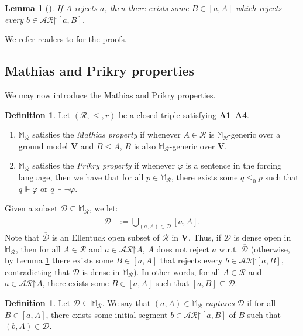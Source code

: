 \documentclass[10pt,a4paper]{amsart}
\theoremstyle{plain}
\numberwithin{equation}{section}
\newtheorem{lemma}[theorem]{Lemma}
\theoremstyle{definition}
\newtheorem{definition}[theorem]{Definition}
\renewcommand{\bar}[1]{\overline{#1}}
\newcommand{\cal}{\mathcal}
\renewcommand{\bf}{\mathbf}
\newcommand{\forces}{\Vdash}
\newcommand{\restrictedto}{\mathord{\upharpoonright}}
\newcommand{\V}{\bf{V}}
\newcommand{\D}{\cal{D}}
\DeclareRobustCommand{\S}{\ifmmode\mathcal{S}\else\Sec\fi}
\begin{document}
\begin{lemma}[{\cite[Lemma 4.35]{T10}}]
\label{lem:completely.reject.reduction}
    If $A$ rejects $a$, then there exists some $B \in [a,A]$ which rejects every $b \in \cal{AR}\restrictedto[a,B]$.
\end{lemma}

We refer readers to \cite[\S4]{T10} for the proofs.

\subsection{Mathias and Prikry properties}
We may now introduce the Mathias and Prikry properties.

\begin{definition}
    Let $(\cal{R},\leq,r)$ be a closed triple satisfying \textbf{A1}--\textbf{A4}.
    \begin{enumerate}
        \item $\mathbb{M}_\cal{R}$ satisfies the \emph{Mathias property} if whenever $A \in \cal{R}$ is $\mathbb{M}_\cal{R}$-generic over a ground model $\V$ and $B \leq A$, $B$ is also $\mathbb{M}_\cal{R}$-generic over $\V$.

        \item $\mathbb{M}_\cal{R}$ satisfies the \emph{Prikry property} if whenever $\varphi$ is a sentence in the forcing language, then we have that for all $p \in \mathbb{M}_\cal{R}$, there exists some $q \leq_0 p$ such that $q \forces \varphi$ or $q \forces \neg\varphi$.
    \end{enumerate}
\end{definition}

Given a subset $\D \subseteq \mathbb{M}_\cal{R}$, we let:
\begin{align*}
    \bar{\D} &:= \bigcup_{(a,A) \in \D} [a,A].
\end{align*}
Note that $\bar{\D}$ is an Ellentuck open subset of $\cal{R}$ in $\V$. Thus, if $\D$ is dense open in $\mathbb{M}_\cal{R}$, then for all $A \in \cal{R}$ and $a \in \cal{AR}\restrictedto A$, $A$ does not reject $a$ w.r.t. $\bar{\D}$ (otherwise, by Lemma \ref{lem:completely.reject.reduction} there exists some $B \in [a,A]$ that rejects every $b \in \cal{AR}\restrictedto[a,B]$, contradicting that $\D$ is dense in $\mathbb{M}_\cal{R}$). In other words, for all $A \in \cal{R}$ and $a \in \cal{AR}\restrictedto A$, there exists some $B \in [a,A]$ such that $[a,B] \subseteq \bar{\D}$.

\begin{definition}
\label{def:capture}
    Let $\D \subseteq \mathbb{M}_\cal{R}$. We say that $(a,A) \in \mathbb{M}_\cal{R}$ \emph{captures} $\D$ if for all $B \in [a,A]$, there exists some initial segment $b \in \cal{AR}\restrictedto[a,B]$ of $B$ such that $(b,A) \in \D$.
\end{definition}
\end{document}
